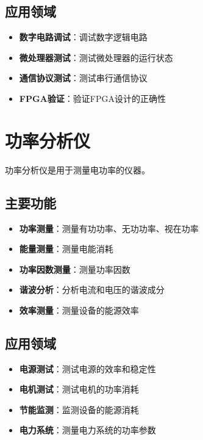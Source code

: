 \subsection{应用领域}
\begin{itemize}
    \item \textbf{数字电路调试}：调试数字逻辑电路
    \item \textbf{微处理器测试}：测试微处理器的运行状态
    \item \textbf{通信协议测试}：测试串行通信协议
    \item \textbf{FPGA验证}：验证FPGA设计的正确性
\end{itemize}

\section{功率分析仪}
\label{sec:power_analyzer}

功率分析仪是用于测量电功率的仪器。

\subsection{主要功能}
\begin{itemize}
    \item \textbf{功率测量}：测量有功功率、无功功率、视在功率
    \item \textbf{能量测量}：测量电能消耗
    \item \textbf{功率因数测量}：测量功率因数
    \item \textbf{谐波分析}：分析电流和电压的谐波成分
    \item \textbf{效率测量}：测量设备的能源效率
\end{itemize}

\subsection{应用领域}
\begin{itemize}
    \item \textbf{电源测试}：测试电源的效率和稳定性
    \item \textbf{电机测试}：测试电机的功率消耗
    \item \textbf{节能监测}：监测设备的能源消耗
    \item \textbf{电力系统}：测量电力系统的功率参数
\end{itemize}


